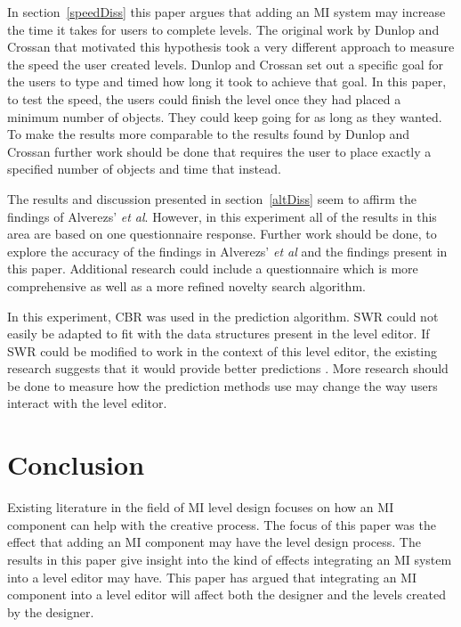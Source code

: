\documentclass[journal]{IEEEtran}
\begin{document}
In section~\ref{speedDiss} this paper argues that adding an MI system may increase the time it takes for users to complete levels. The original work by Dunlop and Crossan\cite{dunlop2000predictive} that motivated this hypothesis took a very different approach to measure the speed the user created levels. Dunlop and Crossan\cite{dunlop2000predictive} set out a specific goal for the users to type and timed how long it took to achieve that goal. In this paper, to test the speed, the users could finish the level once they had placed a minimum number of objects. They could keep going for as long as they wanted. To make the results more comparable to the results found by Dunlop and Crossan\cite{dunlop2000predictive} further work should be done that requires the user to place exactly a specified number of objects and time that instead.

The results and discussion presented in section~\ref{altDiss} seem to affirm the findings of Alverezs' \textit{et al}\cite{alvarez2018fostering}. However, in this experiment all of the results in this area are based on one questionnaire response. Further work should be done, to explore the accuracy of the findings in Alverezs' \textit{et al}\cite{alvarez2018fostering} and the findings present in this paper. Additional research could include a questionnaire which is more comprehensive as well as a more refined novelty search algorithm.

In this experiment, CBR was used in the prediction algorithm. SWR could not easily be adapted to fit with the data structures present in the level editor. If SWR could be modified to work in the context of this level editor, the existing research suggests that it would provide better predictions \cite{shepperd2001comparing, schroeder2016understanding}. More research should be done to measure how the prediction methods use may change the way users interact with the level editor. 

\section{Conclusion}
Existing literature in the field of MI level design focuses on how an MI component can help with the creative process. The focus of this paper was the effect that adding an MI component may have the level design process. The results in this paper give insight into the kind of effects integrating an MI system into a level editor may have. This paper has argued that integrating an MI component into a level editor will affect both the designer and the levels created by the designer.
\end{document}
